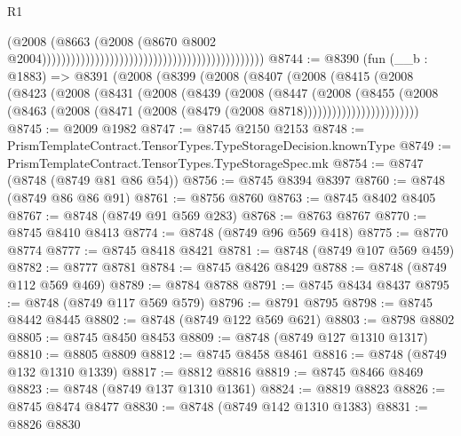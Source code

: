 \begin{lexlean}{R1}
\begin{coremodule}
                                                                                        (@2008
                                                                                          (@8663
                                                                                            (@2008
                                                                                              (@8670
                                                                                                @8002
                                                                                                @2004))))))))))))))))))))))))))))))))))))))))))))))
@8744 := @8390
    (fun (__b : @1883) =>
    @8391
      (@2008
        (@8399
          (@2008
            (@8407
              (@2008
                (@8415
                  (@2008
                    (@8423
                      (@2008
                        (@8431
                          (@2008
                            (@8439
                              (@2008
                                (@8447
                                  (@2008
                                    (@8455
                                      (@2008
                                        (@8463
                                          (@2008
                                            (@8471
                                              (@2008 (@8479 (@2008 @8718))))))))))))))))))))))))
@8745 := @2009 @1982
@8747 := @8745 @2150 @2153
@8748 := PrismTemplateContract.TensorTypes.TypeStorageDecision.knownType
@8749 := PrismTemplateContract.TensorTypes.TypeStorageSpec.mk
@8754 := @8747 (@8748 (@8749 @81 @86 @54))
@8756 := @8745 @8394 @8397
@8760 := @8748 (@8749 @86 @86 @91)
@8761 := @8756 @8760
@8763 := @8745 @8402 @8405
@8767 := @8748 (@8749 @91 @569 @283)
@8768 := @8763 @8767
@8770 := @8745 @8410 @8413
@8774 := @8748 (@8749 @96 @569 @418)
@8775 := @8770 @8774
@8777 := @8745 @8418 @8421
@8781 := @8748 (@8749 @107 @569 @459)
@8782 := @8777 @8781
@8784 := @8745 @8426 @8429
@8788 := @8748 (@8749 @112 @569 @469)
@8789 := @8784 @8788
@8791 := @8745 @8434 @8437
@8795 := @8748 (@8749 @117 @569 @579)
@8796 := @8791 @8795
@8798 := @8745 @8442 @8445
@8802 := @8748 (@8749 @122 @569 @621)
@8803 := @8798 @8802
@8805 := @8745 @8450 @8453
@8809 := @8748 (@8749 @127 @1310 @1317)
@8810 := @8805 @8809
@8812 := @8745 @8458 @8461
@8816 := @8748 (@8749 @132 @1310 @1339)
@8817 := @8812 @8816
@8819 := @8745 @8466 @8469
@8823 := @8748 (@8749 @137 @1310 @1361)
@8824 := @8819 @8823
@8826 := @8745 @8474 @8477
@8830 := @8748 (@8749 @142 @1310 @1383)
@8831 := @8826 @8830

\end{coremodule}
\end{lexlean}
